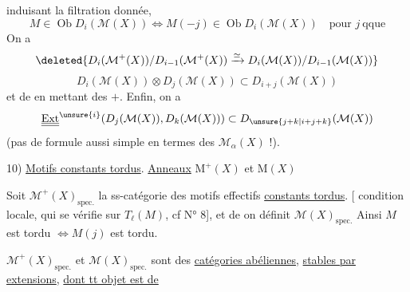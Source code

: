 induisant la filtration donnée, 
\[
M\in\operatorname{Ob}D_i(\mathcal{M}(X))\Longleftrightarrow
M(-j)\in\operatorname{Ob}D_i(\mathcal{M}(X))
\quad\text{pour }j\ \text{qque}
\]
On a
\[
\deleted{D_i(\mathcal{M}^+(X))/D_{i-1}(\mathcal{M}^+(X))
\xrightarrow{\simeq}D_i(\mathcal{M}(X))/D_{i-1}(\mathcal{M}(X))}
\]
\[
D_i(\mathcal{M}(X))\otimes D_j(\mathcal{M}(X))\subset D_{i+j}(\mathcal{M}(X))
\]
et de  en mettant des $+$.
Enfin, on a
\[
\underline{\underline{\operatorname{Ext}}}^{\unsure{i}}(D_j(\mathcal{M}(X)),D_k(\mathcal{M}(X)))
\subset D_{\unsure{j+k|i+j+k}}(\mathcal{M}(X))
\]
(pas de formule aussi simple en termes
des $\mathcal{M}_\alpha(X)$ !).

10) \uline{Motifs constants tordus}. \uline{Anneaux} $\mathrm{M}^+(X)$ et $\mathrm{M}(X)$

Soit $\mathcal{M}^+(X)_{\mathrm{spec.}}$ la ss-catégorie des
motifs effectifs \uline{constants tordus}.
[ condition locale, qui se vérifie sur
$T_\ell(M)$, cf N° 8], et de  on définit
$\mathcal{M}(X)_{\mathrm{spec.}}$ 
Ainsi
$M$ est tordu $\Longleftrightarrow M(j)$ est tordu.

$\mathcal{M}^+(X)_{\mathrm{spec.}}$ et $\mathcal{M}(X)_{\mathrm{spec.}}$ sont des
\uline{catégories abéliennes},
\uline{stables par extensions}, \uline{dont tt objet est de}
